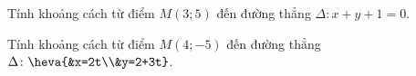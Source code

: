 \begin{baitap}
	Tính khoảng cách từ điểm $M(3;5)$ đến đường thẳng $\Delta\colon x+y+1=0$.
\end{baitap}

\begin{baitap}
	Tính khoảng cách từ điểm $M(4;-5)$ đến đường thẳng $\Delta\colon \heva{&x=2t\\&y=2+3t}$.
\end{baitap}

